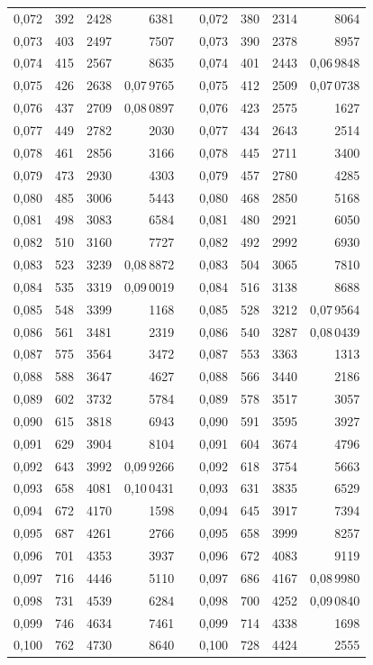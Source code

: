\begin{tabular}{|c|c|c|r|@{}p{9pt}@{}|c|c|c|r|}
0,072 & 392 & 2428 & 6381 &  & 0,072 & 380 & 2314 & 8064 \\
0,073 & 403 & 2497 & 7507 &  & 0,073 & 390 & 2378 & 8957 \\
0,074 & 415 & 2567 & 8635 &  & 0,074 & 401 & 2443 & 0,06\,9848 \\
0,075 & 426 & 2638 & 0,07\,9765 &  & 0,075 & 412 & 2509 & 0,07\,0738 \\[3pt]
0,076 & 437 & 2709 & 0,08\,0897 &  & 0,076 & 423 & 2575 & 1627 \\
0,077 & 449 & 2782 & 2030 &  & 0,077 & 434 & 2643 & 2514 \\
0,078 & 461 & 2856 & 3166 &  & 0,078 & 445 & 2711 & 3400 \\
0,079 & 473 & 2930 & 4303 &  & 0,079 & 457 & 2780 & 4285 \\
0,080 & 485 & 3006 & 5443 &  & 0,080 & 468 & 2850 & 5168 \\[3pt]
0,081 & 498 & 3083 & 6584 &  & 0,081 & 480 & 2921 & 6050 \\
0,082 & 510 & 3160 & 7727 &  & 0,082 & 492 & 2992 & 6930 \\
0,083 & 523 & 3239 & 0,08\,8872 &  & 0,083 & 504 & 3065 & 7810 \\
0,084 & 535 & 3319 & 0,09\,0019 &  & 0,084 & 516 & 3138 & 8688 \\
0,085 & 548 & 3399 & 1168 &  & 0,085 & 528 & 3212 & 0,07\,9564 \\[3pt]
0,086 & 561 & 3481 & 2319 &  & 0,086 & 540 & 3287 & 0,08\,0439 \\
0,087 & 575 & 3564 & 3472 &  & 0,087 & 553 & 3363 & 1313 \\
0,088 & 588 & 3647 & 4627 &  & 0,088 & 566 & 3440 & 2186 \\
0,089 & 602 & 3732 & 5784 &  & 0,089 & 578 & 3517 & 3057 \\
0,090 & 615 & 3818 & 6943 &  & 0,090 & 591 & 3595 & 3927 \\[3pt]
0,091 & 629 & 3904 & 8104 &  & 0,091 & 604 & 3674 & 4796 \\
0,092 & 643 & 3992 & 0,09\,9266 &  & 0,092 & 618 & 3754 & 5663 \\
0,093 & 658 & 4081 & 0,10\,0431 &  & 0,093 & 631 & 3835 & 6529 \\
0,094 & 672 & 4170 & 1598 &  & 0,094 & 645 & 3917 & 7394 \\
0,095 & 687 & 4261 & 2766 &  & 0,095 & 658 & 3999 & 8257 \\[3pt]
0,096 & 701 & 4353 & 3937 &  & 0,096 & 672 & 4083 & 9119 \\
0,097 & 716 & 4446 & 5110 &  & 0,097 & 686 & 4167 & 0,08\,9980 \\
0,098 & 731 & 4539 & 6284 &  & 0,098 & 700 & 4252 & 0,09\,0840 \\
0,099 & 746 & 4634 & 7461 &  & 0,099 & 714 & 4338 & 1698 \\
0,100 & 762 & 4730 & 8640 &  & 0,100 & 728 & 4424 & 2555 \\
\hline
\end{tabular}\par
